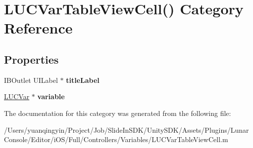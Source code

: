 \hypertarget{category_l_u_c_var_table_view_cell_07_08}{}\section{L\+U\+C\+Var\+Table\+View\+Cell() Category Reference}
\label{category_l_u_c_var_table_view_cell_07_08}
\subsection*{Properties}
\begin{DoxyCompactItemize}
\item 
\mbox{\label{category_l_u_c_var_table_view_cell_07_08_a8ffc7575d018d7f8ad52b39269a7eb50}} 
I\+B\+Outlet U\+I\+Label $\ast$ {\bfseries title\+Label}
\item 
\mbox{\label{category_l_u_c_var_table_view_cell_07_08_a67a7d37a3f1a05fc8ab252f7058cb1e5}} 
\mbox{\hyperlink{interface_l_u_c_var}{L\+U\+C\+Var}} $\ast$ {\bfseries variable}
\end{DoxyCompactItemize}


The documentation for this category was generated from the following file\+:\begin{DoxyCompactItemize}
\item 
/\+Users/yuanqingyin/\+Project/\+Job/\+Slide\+In\+S\+D\+K/\+Unity\+S\+D\+K/\+Assets/\+Plugins/\+Lunar\+Console/\+Editor/i\+O\+S/\+Full/\+Controllers/\+Variables/L\+U\+C\+Var\+Table\+View\+Cell.\+m\end{DoxyCompactItemize}
